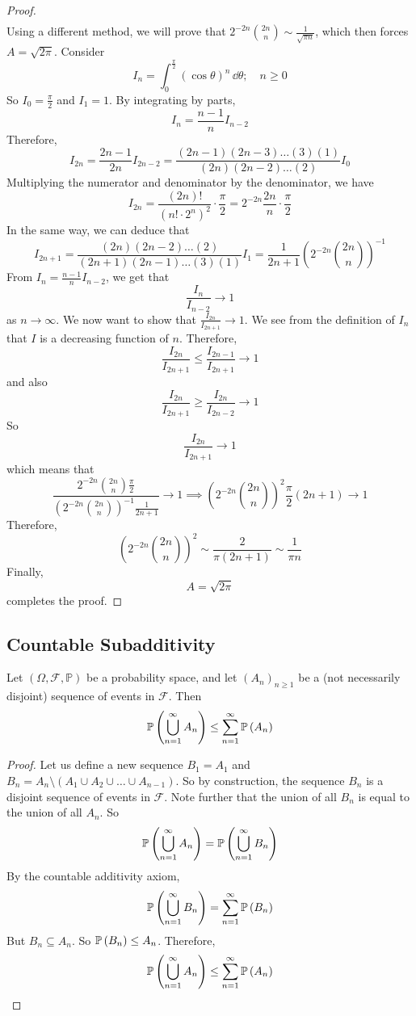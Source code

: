 \documentclass{article}
\begin{document}
\begin{proof}
\begin{align*}
    \end{align*}
    Using a different method, we will prove that $2^{-2n} \binom{2n}{n} \sim \frac{1}{\sqrt{\pi n}}$, which then forces $A = \sqrt{2\pi}$. Consider
    \[ I_n = \int_0^{\frac{\pi}{2}} (\cos \theta)^n \, \dd \theta;\quad n \geq 0 \]
    So $I_0 = \frac{\pi}{2}$ and $I_1 = 1$. By integrating by parts,
    \[ I_n = \frac{n-1}{n}I_{n-2} \]
    Therefore,
    \[ I_{2n} = \frac{2n-1}{2n}I_{2n-2} = \frac{(2n-1)(2n-3)\dots(3)(1)}{(2n)(2n-2)\dots(2)}I_0 \]
    Multiplying the numerator and denominator by the denominator, we have
    \[ I_{2n} = \frac{(2n)!}{(n! \cdot 2^n)^2} \cdot \frac{\pi}{2} = 2^{-2n} \frac{2n}{n} \cdot \frac{\pi}{2} \]
    In the same way, we can deduce that
    \[ I_{2n+1} = \frac{(2n)(2n-2)\dots(2)}{(2n+1)(2n-1)\dots(3)(1)}I_1 = \frac{1}{2n+1} \left( 2^{-2n} \binom{2n}{n} \right)^{-1} \]
    From $I_n = \frac{n-1}{n}I_{n-2}$, we get that
    \[ \frac{I_n}{I_{n-2}} \to 1 \]
    as $n \to \infty$. We now want to show that $\frac{I_{2n}}{I_{2n+1}} \to 1$. We see from the definition of $I_n$ that $I$ is a decreasing function of $n$. Therefore,
    \[ \frac{I_{2n}}{I_{2n+1}} \leq \frac{I_{2n-1}}{I_{2n+1}} \to 1 \]
    and also
    \[ \frac{I_{2n}}{I_{2n+1}} \geq \frac{I_{2n}}{I_{2n-2}} \to 1 \]
    So
    \[ \frac{I_{2n}}{I_{2n+1}} \to 1 \]
    which means that
    \[ \frac{2^{-2n} \binom{2n}{n} \frac{\pi}{2}}{\left( 2^{-2n} \binom{2n}{n} \right)^{-1} \frac{1}{2n+1}} \to 1 \implies \left( 2^{-2n} \binom{2n}{n} \right)^2 \frac{\pi}{2} (2n+1) \to 1 \]
    Therefore,
    \[ \left( 2^{-2n} \binom{2n}{n} \right)^2 \sim \frac{2}{\pi (2n+1)} \sim \frac{1}{\pi n} \]
    Finally,
    \[ A = \sqrt{2 \pi} \]
    completes the proof.
\end{proof}

\subsection{Countable Subadditivity}
Let $(\Omega, \mathcal F, \mathbb P)$ be a probability space, and let $(A_n)_{n \geq 1}$ be a (not necessarily disjoint) sequence of events in $\mathcal F$. Then
\[ \mathbb{P}\left({\bigcup_{n=1}^\infty A_n}\right) \leq \sum_{n=1}^\infty \mathbb{P}\left({A_n}\right) \]
\begin{proof}
    Let us define a new sequence $B_1 = A_1$ and $B_n = A_n \setminus (A_1 \cup A_2 \cup \dots \cup A_{n-1})$. So by construction, the sequence $B_n$ is a disjoint sequence of events in $\mathcal F$. Note further that the union of all $B_n$ is equal to the union of all $A_n$. So
    \[ \mathbb{P}\left({\bigcup_{n=1}^\infty A_n}\right) = \mathbb{P}\left({\bigcup_{n=1}^\infty B_n}\right) \]
    By the countable additivity axiom,
    \[ \mathbb{P}\left({\bigcup_{n=1}^\infty B_n}\right) = \sum_{n=1}^\infty \mathbb{P}\left({B_n}\right) \]
    But $B_n \subseteq A_n$. So $\mathbb{P}\left({B_n}\right) \leq A_n$. Therefore,
    \[ \mathbb{P}\left({\bigcup_{n=1}^\infty A_n}\right) \leq \sum_{n=1}^\infty \mathbb{P}\left({A_n}\right) \]
\end{proof}
\end{document}
